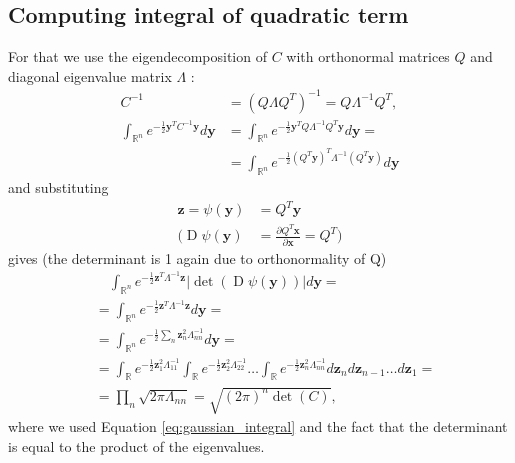 \documentclass{paper}
\newcommand{\abs}[1]{\left| #1 \right|}
\newcommand{\vr}[1]{\ensuremath{\boldsymbol{#1}}}
\newcommand{\f}[1]{\operatorname{#1}}
\newcommand{\yvec}[0]{\ensuremath{\vr{y}}}
\newcommand{\zvec}[0]{\ensuremath{\vr{z}}}
\begin{document}
\subsection{Computing integral of quadratic term}
For that we use the eigendecomposition of $C$ with orthonormal matrices $Q$ and diagonal eigenvalue matrix $\Lambda$ \cite{wiki_eigendecomp}:
\begin{align*}
	C^{-1} &= (Q \Lambda Q^T)^{-1} = Q \Lambda^{-1} Q^T, \nonumber \\
	\int_{\mathbb{R}^n} e^{-\frac{1}{2} \yvec^T C^{-1} \yvec}  d\yvec
	&= \int_{\mathbb{R}^n} e^{-\frac{1}{2} \yvec^T Q \Lambda^{-1} Q^T \yvec}  d\yvec =  \nonumber \\
	&= \int_{\mathbb{R}^n} e^{-\frac{1}{2} (Q^T \yvec)^T \Lambda^{-1} (Q^T \yvec)}  d\yvec
\end{align*}
and substituting
\begin{align*}
\zvec = \psi(\yvec) &= Q^T \yvec \\
\Bigg( \f{D}\psi(\yvec) &= \frac{\partial Q^T \vr{x}}{\partial \vr{x}} = Q^T \Bigg)
\end{align*}
gives (the determinant is 1 again due to orthonormality of Q)
\begin{align*}
	&\quad \int_{\mathbb{R}^n} e^{-\frac{1}{2} \zvec^T \Lambda^{-1} \zvec} \abs{\f{det}(\f{D}\psi(\yvec))} d\yvec =\\
	&= \int_{\mathbb{R}^n} e^{-\frac{1}{2} \zvec^T \Lambda^{-1} \zvec} d\yvec =\\
	&= \int_{\mathbb{R}^n} e^{-\frac{1}{2} \sum_{n} \zvec_n^2 \Lambda_{nn}^{-1} } d\yvec =\\
	&= \int_{\mathbb{R}} e^{-\frac{1}{2} \zvec_1^2 \Lambda_{11}^{-1} } \int_{\mathbb{R}} e^{-\frac{1}{2} \zvec_2^2 \Lambda_{22}^{-1} } \dots \int_{\mathbb{R}} e^{-\frac{1}{2} \zvec_n^2 \Lambda_{nn}^{-1} } d\zvec_n d\zvec_{n-1} \dots d\zvec_1 =\\
	&= \prod_{n} \sqrt{2 \pi \Lambda_{nn}} = \sqrt{(2 \pi)^n \f{det}(C)},
\end{align*}
where we used Equation \ref{eq:gaussian_integral} and the fact that the determinant is equal to the product of the eigenvalues.
\end{document}
